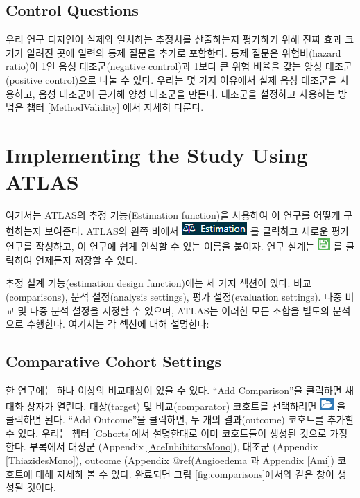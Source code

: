 \documentclass[11pt]{book}
\theoremstyle{definition}
\theoremstyle{definition}
\theoremstyle{definition}
\theoremstyle{remark}
\begin{document}
\subsection{Control Questions}\label{control-questions}

우리 연구 디자인이 실제와 일치하는 추정치를 산출하는지 평가하기 위해
진짜 효과 크기가 알려진 곳에 일련의 통제 질문을 추가로 포함한다. 통제
질문은 위험비(hazard ratio)이 1인 음성 대조군(negative control)과 1보다
큰 위험 비율을 갖는 양성 대조군(positive control)으로 나눌 수 있다.
우리는 몇 가지 이유에서 실제 음성 대조군을 사용하고, 음성 대조군에
근거해 양성 대조군을 만든다. 대조군을 설정하고 사용하는 방법은 챕터
\ref{MethodValidity} 에서 자세히 다룬다.

\section{Implementing the Study Using ATLAS}\label{PleAtlas}

여기서는 ATLAS의 추정 기능(Estimation function)을 사용하여 이 연구를
어떻게 구현하는지 보여준다. ATLAS의 왼쪽 바에서
\includegraphics{images/PopulationLevelEstimation/estimation.png} 를
클릭하고 새로운 평가 연구를 작성하고, 이 연구에 쉽게 인식할 수 있는
이름을 붙이자. 연구 설계는
\includegraphics{images/PopulationLevelEstimation/save.png} 를 클릭하여
언제든지 저장할 수 있다.

추정 설계 기능(estimation design function)에는 세 가지 섹션이 있다:
비교(comparisons), 분석 설정(analysis settings), 평가 설정(evaluation
settings). 다중 비교 및 다중 분석 설정을 지정할 수 있으며, ATLAS는
이러한 모든 조합을 별도의 분석으로 수행한다. 여기서는 각 섹션에 대해
설명한다:

\subsection{Comparative Cohort Settings}\label{ComparisonSettings}

한 연구에는 하나 이상의 비교대상이 있을 수 있다. ``Add Comparison''을
클릭하면 새 대화 상자가 열린다. 대상(target) 및 비교(comparator)
코호트를 선택하려면
\includegraphics{images/PopulationLevelEstimation/open.png} 을 클릭하면
된다. ``Add Outcome''을 클릭하면, 두 개의 결과(outcome) 코호트를 추가할
수 있다. 우리는 챕터 \ref{Cohorts}에서 설명한대로 이미 코호트들이 생성된
것으로 가정한다. 부록에서 대상군 (Appendix \ref{AceInhibitorsMono}),
대조군 (Appendix \ref{ThiazidesMono}), outcome (Appendix @ref(Angioedema
과 Appendix \ref{Ami}) 코호트에 대해 자세하 볼 수 있다. 완료되면 그림
\ref{fig:comparisons}에서와 같은 창이 생성될 것이다.
\end{document}
